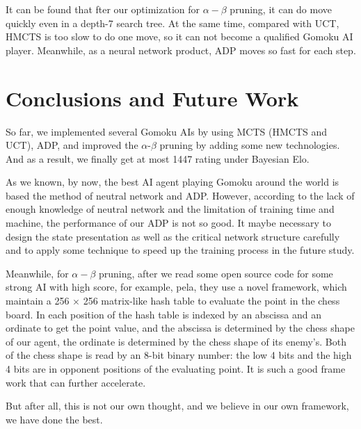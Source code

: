 \documentclass[sigconf, nonacm]{acmart}
\begin{document}
It can be found that fter our optimization for $\alpha-\beta$ pruning, it can do move quickly even in a depth-7 search tree. At the same time, compared with UCT, HMCTS is too slow to do one move, so it can not become a qualified Gomoku AI player. Meanwhile, as a neural network product, ADP moves so fast for each step.

\section{Conclusions and Future Work}

\quad So far, we implemented several Gomoku AIs by using MCTS (HMCTS and UCT), ADP, and improved the $\alpha$-$\beta$ pruning by adding some new technologies.
%
And as a result, we finally get at most 1447 rating under Bayesian Elo.

As we known, by now, the best AI agent playing Gomoku around the world is based the method of neutral network and ADP.
%
However, according to the lack of enough knowledge of neutral network and the limitation of training time and machine, the performance of our ADP is not so good.
%
It maybe necessary to design the state presentation as well as the critical network structure carefully and to apply some technique to speed up the training process in the future study.

Meanwhile, for $\alpha-\beta$ pruning, after we read some open source code for some strong AI with high score, for example, pela, they use a novel framework, which maintain a 256 $\times$ 256 matrix-like hash table to evaluate the point in the chess board. 
%
In each position of the hash table is indexed by an abscissa and an ordinate to get the point value, and the abscissa is determined by the chess shape of our agent, the ordinate is determined by the chess shape of its enemy's. 
%
Both of the chess shape is read by an 8-bit binary number: the low 4 bits and the high 4 bits are in opponent positions of the evaluating point. It is such a good frame work that can further accelerate. 

But after all, this is not our own thought, and we believe in our own framework, we have done the best.












\end{document}
